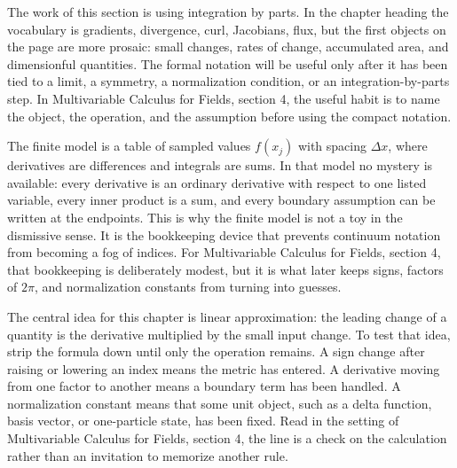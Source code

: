 











The work of this section is using integration by parts.  In the chapter heading the vocabulary is gradients, divergence, curl, Jacobians, flux, but the first objects on the page are more prosaic: small changes, rates of change, accumulated area, and dimensionful quantities.  The formal notation will be useful only after it has been tied to a limit, a symmetry, a normalization condition, or an integration-by-parts step.  In Multivariable Calculus for Fields, section 4, the useful habit is to name the object, the operation, and the assumption before using the compact notation.

The finite model is a table of sampled values \(f(x_j)\) with spacing \(\Delta x\), where derivatives are differences and integrals are sums.  In that model no mystery is available: every derivative is an ordinary derivative with respect to one listed variable, every inner product is a sum, and every boundary assumption can be written at the endpoints.  This is why the finite model is not a toy in the dismissive sense.  It is the bookkeeping device that prevents continuum notation from becoming a fog of indices.  For Multivariable Calculus for Fields, section 4, that bookkeeping is deliberately modest, but it is what later keeps signs, factors of \(2\pi\), and normalization constants from turning into guesses.

The central idea for this chapter is linear approximation: the leading change of a quantity is the derivative multiplied by the small input change.  To test that idea, strip the formula down until only the operation remains.  A sign change after raising or lowering an index means the metric has entered.  A derivative moving from one factor to another means a boundary term has been handled.  A normalization constant means that some unit object, such as a delta function, basis vector, or one-particle state, has been fixed.  Read in the setting of Multivariable Calculus for Fields, section 4, the line is a check on the calculation rather than an invitation to memorize another rule.


